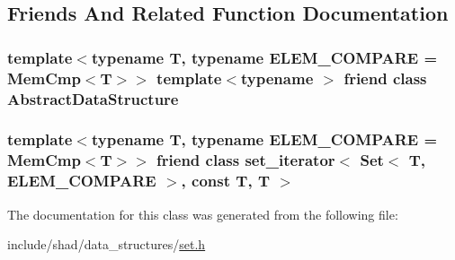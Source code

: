 \subsection{Friends And Related Function Documentation}
\hypertarget{classshad_1_1Set_ab18afa4496cc863ddc11bab94b2adf57}{
\subsubsection[{Abstract\-Data\-Structure}]{\setlength{\rightskip}{0pt plus 5cm}template$<$typename T, typename E\-L\-E\-M\-\_\-\-C\-O\-M\-P\-A\-R\-E = Mem\-Cmp$<$\-T$>$$>$ template$<$typename $>$ friend class {\bf Abstract\-Data\-Structure}\hspace{0.3cm}{\ttfamily [friend]}}}\label{classshad_1_1Set_ab18afa4496cc863ddc11bab94b2adf57}
\hypertarget{classshad_1_1Set_a98fe017bca451c95c75b7e3d03b3d15a}{
\subsubsection[{set\-\_\-iterator$<$ Set$<$ T, E\-L\-E\-M\-\_\-\-C\-O\-M\-P\-A\-R\-E $>$, const T, T $>$}]{\setlength{\rightskip}{0pt plus 5cm}template$<$typename T, typename E\-L\-E\-M\-\_\-\-C\-O\-M\-P\-A\-R\-E = Mem\-Cmp$<$\-T$>$$>$ friend class {\bf set\-\_\-iterator}$<$ {\bf Set}$<$ T, E\-L\-E\-M\-\_\-\-C\-O\-M\-P\-A\-R\-E $>$, const T, T $>$\hspace{0.3cm}{\ttfamily [friend]}}}\label{classshad_1_1Set_a98fe017bca451c95c75b7e3d03b3d15a}


The documentation for this class was generated from the following file\-:\begin{DoxyCompactItemize}
\item 
include/shad/data\-\_\-structures/\hyperlink{set_8h}{set.\-h}\end{DoxyCompactItemize}
